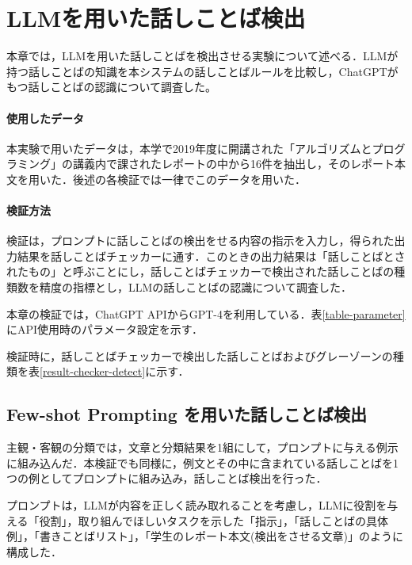 \chapter{LLMを用いた話しことば検出 \label{c7a}}

本章では，LLMを用いた話しことばを検出させる実験について述べる．LLMが持つ話しことばの知識を本システムの話しことばルールを比較し，ChatGPTがもつ話しことばの認識について調査した。

\subsubsection{使用したデータ}
本実験で用いたデータは，本学で2019年度に開講された「アルゴリズムとプログラミング」の講義内で課されたレポートの中から16件を抽出し，そのレポート本文を用いた．後述の各検証では一律でこのデータを用いた．

\subsubsection{検証方法}
検証は，プロンプトに話しことばの検出をせる内容の指示を入力し，得られた出力結果を話しことばチェッカーに通す．このときの出力結果は「話しことばとされたもの」と呼ぶことにし，話しことばチェッカーで検出された話しことばの種類数を精度の指標とし，LLMの話しことばの認識について調査した．

本章の検証では，ChatGPT APIからGPT-4を利用している．表\ref{table-parameter}にAPI使用時のパラメータ設定を示す．

検証時に，話しことばチェッカーで検出した話しことばおよびグレーゾーンの種類を表\ref{result-checker-detect}に示す．




\section{Few-shot Prompting を用いた話しことば検出 \label{c7as1}}
主観・客観の分類では，文章と分類結果を1組にして，プロンプトに与える例示に組み込んだ．本検証でも同様に，例文とその中に含まれている話しことばを1つの例としてプロンプトに組み込み，話しことば検出を行った．



プロンプトは，LLMが内容を正しく読み取れることを考慮し，LLMに役割を与える「役割」，取り組んでほしいタスクを示した「指示」，「話しことばの具体例」，「書きことばリスト」，「学生のレポート本文(検出をさせる文章)」のように構成した．

